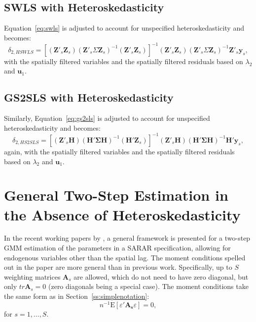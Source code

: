 \documentclass{article}
\begin{document}
\subsection{SWLS with Heteroskedasticity}
Equation~\ref{eq:swls} is adjusted to account for unspecified heteroskedasticity
and becomes:
\begin{equation*}
\delta_{2,HSWLS} =  [ ( \mathbf{Z'}_s \mathbf{Z}_s ) ( \mathbf{Z'}_s \Sigma \mathbf{Z}_s )^{-1}
 ( \mathbf{Z'}_s \mathbf{Z}_s) ]^{-1} ( \mathbf{Z'}_s \mathbf{Z}_s )  ( \mathbf{Z'}_s \Sigma \mathbf{Z}_s )^{-1} \mathbf{Z'}_s \mathbf{y}_s,
\end{equation*}
with the spatially filtered variables and the spatially filtered residuals based on $\lambda_2$
and $\mathbf{u}_1$.

\subsection{GS2SLS with Heteroskedasticity}
Similarly, Equation~\ref{eq:gs2sls} is adjusted to account for unspecified heteroskedasticity
and becomes:
\begin{equation*}
\delta_{2,HS2SLS} = [ ( \mathbf{Z'}_s \mathbf{H} )(\mathbf{H' \Sigma H})^{-1} ( \mathbf{H'} \mathbf{Z}_s ) ]^{-1} ( \mathbf{Z'}_s \mathbf{H} ) (\mathbf{H' \Sigma H})^{-1} \mathbf{H'} \mathbf{y}_s,
\end{equation*}
again, with the spatially filtered variables and the spatially filtered residuals based on $\lambda_2$
and $\mathbf{u}_1$.

\section{General Two-Step Estimation in the Absence of Heteroskedasticity}
In the recent working papers by \cite{Drukkeretal:10,Drukkeretal:11}, a general framework is presented
for a two-step GMM estimation of the parameters in a SARAR specification, allowing
for endogenous variables other than the spatial lag. The moment conditions spelled out in the
paper are more general than in previous work.
Specifically, up to $S$ weighting matrices $\mathbf{A}_s$ are allowed, which do not need
to have zero diagonal, but only $tr \mathbf{A}_s = 0$ (zero diagonals being a special
case). The moment conditions take the same form as in Section~\ref{ss:simplenotation}:
\begin{equation}\label{eq:generalmomenteq}
 n^{-1} \mbox{E}[\varepsilon' \mathbf{A_s} \varepsilon ] = 0,
\end{equation}
for $s = 1, \dots, S$.
 
\end{document}
